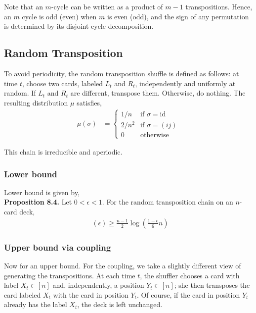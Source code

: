 \documentclass[12pt]{article}
\DeclareMathOperator*{\mix}{t_{\text{mix}}}
\begin{document}
Note that an $m$-cycle can be written as a product of $m-1$ transpositions. Hence, an $m$ cycle is odd (even) when $m$ is even (odd), and the sign of any permutation is determined by its disjoint cycle decomposition.

\subsection{Random Transposition}

To avoid periodicity, the random transposition shuffle is defined as follows: at time $t$, choose two cards, labeled $L_t$ and $R_t$, independently and uniformly at random. If $L_t$ and $R_t$ are different, transpose them. Otherwise, do nothing. The resulting distribution $\mu$ satisfies,
\begin{align*}
\mu(\sigma) &= \begin{cases}
1/n & \text{if } \sigma = \text{id}\\
2/n^2 & \text{if } \sigma = (ij)\\
0 & \text{otherwise}
\end{cases}
\end{align*}

This chain is irreducible and aperiodic.

\subsubsection{Lower bound}
Lower bound is given by,\\

\textbf{Proposition 8.4.} Let $0 < \epsilon < 1$. For the random transposition chain on an $n$-card deck,
\begin{align*}
\mix(\epsilon) \geq \frac{n-1}{2} \log \left(\frac{1-\epsilon}{6} n \right)
\end{align*}

\subsubsection{Upper bound via coupling}

Now for an upper bound. For the coupling, we take a slightly different view of generating the transpositions. At each time $t$, the shuffler chooses a card with label $X_t \in [n]$ and, independently, a position $Y_t \in [n]$; she then transposes the card labeled $X_t$ with the card in position $Y_t$. Of course, if the card in position $Y_t$ already has the label $X_t$, the deck is left unchanged.\\
\end{document}
